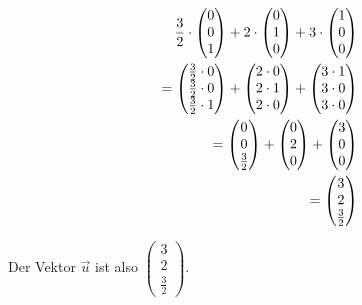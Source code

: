 \begin{align*}
    \frac{3}{2} \cdot \begin{pmatrix} 0 \\ 0 \\ 1 \end{pmatrix} + 2 \cdot \begin{pmatrix} 0 \\ 1 \\ 0 \end{pmatrix} + 3 \cdot \begin{pmatrix} 1 \\ 0 \\ 0 \end{pmatrix} \\
    =  \begin{pmatrix}
        \frac{3}{2} \cdot 0 \\ \frac{3}{2} \cdot 0 \\ \frac{3}{2} \cdot 1
    \end{pmatrix} + \begin{pmatrix}
        2 \cdot 0 \\ 2 \cdot 1 \\ 2 \cdot 0
    \end{pmatrix} + \begin{pmatrix}
        3 \cdot 1 \\ 3 \cdot 0 \\ 3 \cdot 0
    \end{pmatrix} \\\pagebreak[2]
    = \begin{pmatrix}
        0 \\ 0 \\ \frac{3}{2}
    \end{pmatrix} + \begin{pmatrix}
        0 \\ 2 \\ 0
    \end{pmatrix} + \begin{pmatrix}
        3 \\ 0 \\ 0
    \end{pmatrix} \\\pagebreak[2]
    = \begin{pmatrix}
        3 \\ 2 \\ \frac{3}{2}
    \end{pmatrix}
\end{align*}

Der Vektor $\vec{u}$ ist also $\begin{pmatrix}
    3 \\ 2 \\ \frac{3}{2}
\end{pmatrix}$.

